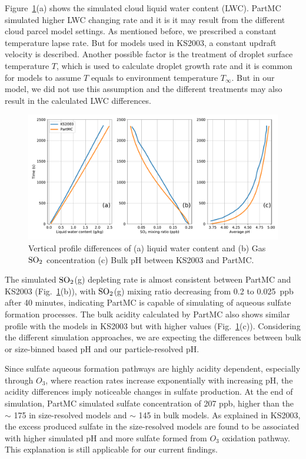 \documentclass[edeposit,fullpage]{uiucthesis2009}
\begin{document}
Figure~\ref{chap2:ks2003}(a) shows the simulated cloud liquid water content (LWC). PartMC simulated higher LWC changing rate and it is it may result from the different cloud parcel model settings. As mentioned before, we prescribed a constant temperature lapse rate. But for models used in KS2003, a constant updraft velocity is described. Another possible factor is the treatment of droplet surface temperature $T$, which is used to calculate droplet growth rate and it is common for models to assume $T$ equals to environment temperature $T_\infty$. But in our model, we did not use this assumption and the different treatments may also result in the calculated LWC differences.

\begin{figure}[ht]
    \centering \includegraphics[scale=0.5]{chap2_figs/chap2_fig1_profile.pdf}
    \caption{Vertical profile differences of (a) liquid water content and (b) Gas $\rm SO_2$ concentration (c) Bulk pH between KS2003 and PartMC.}
    \label{chap2:ks2003}
\end{figure}

The simulated $\rm SO_2$(g) depleting rate is almost consistent between PartMC and KS2003 (Fig.~\ref{chap2:ks2003}(b)), with $\rm SO_2$(g) mixing ratio decreasing from 0.2 to 0.025~ppb after 40 minutes, indicating PartMC is capable of simulating of aqueous sulfate formation processes. The bulk acidity calculated by PartMC also shows similar profile with the models in KS2003 but with higher values (Fig.~\ref{chap2:ks2003}(c)). Considering the different simulation approaches, we are expecting the differences between bulk or size-binned based pH and our particle-resolved pH. 

Since sulfate aqueous formation pathways are highly acidity dependent, especially through $O_3$, where reaction rates increase exponentially with increasing pH, the acidity differences imply noticeable changes in sulfate production. At the end of simulation, PartMC simulated sulfate concentration of 207 ppb, higher than the $\sim$ 175 in size-resolved models and $\sim$ 145 in bulk models. As explained in KS2003, the excess produced sulfate in the size-resolved models are found to be associated with higher simulated pH and more sulfate formed from $O_3$ oxidation pathway. This explanation is still applicable for our current findings. 
\end{document}
